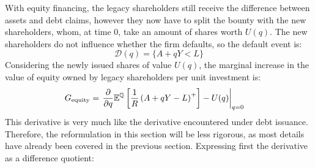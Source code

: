 \documentclass[main.tex]{subfiles}
\begin{document}
        With equity financing, the legacy shareholders still receive the difference between assets and debt claims,
        however they now have to split the bounty with the new shareholders, 
        whom, at time 0, take an amount of shares worth $U(q)$. 
        The new shareholders do not influence whether the firm defaults, so the default event is:
            \begin{equation*}
                \mathcal{D}(q)
                = 
                \{
                    A + qY < L
                \}
            \end{equation*}
        Considering the newly issued shares of value $U(q)$,
        the marginal increase in the value of equity owned by legacy shareholders per unit investment is:
            \begin{align}
                G_{\text{equity}} &=
                    \left.
                    \frac{
                        \partial 
                    }{
                        \partial 
                        q
                    }
                    \mathbb{E}^{\mathbb{Q}}\left[
                        \frac{1}{R} 
                        \left(
                            A + qY - L
                        \right)^{+}
                    \right]
                    -
                    U(q) 
                    \right\rvert_{q=0} 
                    \nonumber
            \end{align}
        This derivative is very much like the derivative encountered under debt issuance.
        Therefore, the reformulation in this section will be less rigorous,
        as most details have already been covered in the previous section.
        Expressing first the derivative as a difference quotient:
\end{document}
